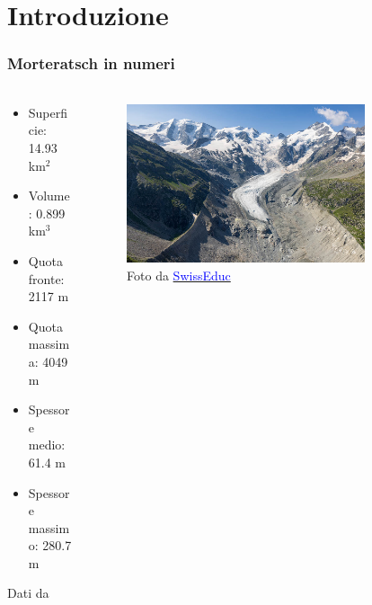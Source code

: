 \section{Introduzione}


\begin{frame}
    \frametitle{Morteratsch in numeri}
    \framesubtitle{}

    \begin{columns}
        \begin{column}{0.5\textwidth}
            \begin{itemize}[itemsep=0.5em, label=$\bullet$]
                \item Superficie: 14.93 km$^2$
                \item Volume: 0.899 km$^3$
                \item Quota fronte: 2117 m
                \item Quota massima: 4049 m
                \item Spessore medio: 61.4 m
                \item Spessore massimo: 280.7 m
            \end{itemize}
            \vspace{12pt}

            Dati da 
        \end{column}
        
        \begin{column}{0.5\textwidth}
        \begin{figure}
            \includegraphics[width=0.8\textwidth]{Immagini/AereaMorteratsch.jpg}
            \caption{Foto da \href{https://www.swisseduc.ch/glaciers/morteratsch/2021/index-en.html}{\textcolor{blue}{SwissEduc}}}
          \end{figure}
        \end{column}
      \end{columns}
  
\end{frame}


